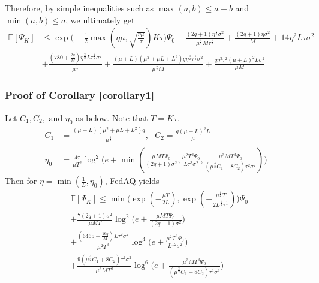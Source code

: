\documentclass[11pt]{article}
\begin{document}
Therefore, by simple inequalities such as $\max(a, b) \leq a+b$ and $\min(a, b) \leq a$, we ultimately get
\begin{align} \label{ineq_theorem1}
    \mathbb{E}[\Psi_K] &\leq \exp{\Big(-\frac{1}{2}\max(\eta\mu, \sqrt{\frac{\eta\mu}{\tau}})K\tau\Big)} \Psi_0 + \frac{(2q+1)\eta^{\frac{1}{2}}\sigma^2}{\mu^{\frac{1}{2}}M\tau^{\frac{1}{2}}} + \frac{(2q+1)\eta\sigma^2}{M} + 14\eta^2 L\tau\sigma^2 \nonumber\\
        &+ \frac{(780+\frac{2q}{M})\eta^{\frac{3}{2}}L\tau^{\frac{1}{2}}\sigma^2}{\mu^{\frac{1}{2}}} + \frac{(\mu+L)(\mu^2+\mu L+L^2)q\eta^{\frac{3}{2}}\tau^{\frac{1}{2}}\sigma^2}{\mu^{\frac{5}{2}}M} + \frac{q\eta^3\tau^2(\mu+L)^2 L\sigma^2}{\mu M}
\end{align}

\subsubsection{Proof of Corollary \ref{corollary1}}
\label{app:proof_corollary}

\begin{corollary} \label{corollary1}
    Let $C_1, C_2,\textrm{ and } \eta_0$ as below. Note that $T = K\tau$.
    \begin{align*}
        C_1 &= \frac{(\mu+L)(\mu^2+\mu L+L^2)q}{\mu^{\frac{5}{2}}}, \textrm{ } C_2 = \frac{q(\mu+L)^2 L}{\mu} \\
        \eta_0 &= \frac{4\tau}{\mu T^2}\log^2\Big(e+\min(\frac{\mu M T \Psi_0}{(2q+1)\sigma^2}, \frac{\mu^2 T^3\Psi_0}{L\tau^2\sigma^2}, \frac{\mu^3 M T^3\Psi_0}{(\mu^{\frac{3}{2}}C_1+8C_2)\tau^2\sigma^2}) \Big)
    \end{align*}
    Then for $\eta = \min(\frac{1}{L}, \eta_0)$, FedAQ yields
    \begin{align}
        &\mathbb{E}[\Psi_K] \leq \min \Big( \exp(-\frac{\mu T}{2L}), \exp(-\frac{\mu^{\frac{1}{2}}T}{2 L^{\frac{1}{2}}\tau^{\frac{1}{2}}})\Big) \Psi_0 \nonumber \\
        &+ \frac{7(2q+1)\sigma^2}{\mu MT} \log^2 \Big(e+\frac{\mu M T \Psi_0}{(2q+1)\sigma^2}\Big) \\
        &+ \frac{(6465+\frac{16q}{M})L\tau^2\sigma^2}{\mu^2 T^3}\log^4 \Big(e+ \frac{\mu^2 T^3\Psi_0}{L\tau^2\sigma^2}\Big) \\
        &+ \frac{9(\mu^{\frac{3}{2}}C_1+8C_2)\tau^2\sigma^2}{\mu^3 M T^3} \log^6 \Big(e + \frac{\mu^3 M T^3\Psi_0}{(\mu^{\frac{3}{2}}C_1+8C_2)\tau^2\sigma^2}\Big)
    \end{align}
\end{corollary}
\end{document}
